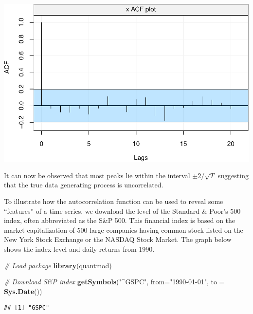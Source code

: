 \documentclass[]{book}
\newenvironment{Shaded}{\begin{snugshade}}{\end{snugshade}}
\newcommand{\CommentTok}[1]{\textcolor[rgb]{0.56,0.35,0.01}{\textit{#1}}}
\newcommand{\DataTypeTok}[1]{\textcolor[rgb]{0.13,0.29,0.53}{#1}}
\newcommand{\KeywordTok}[1]{\textcolor[rgb]{0.13,0.29,0.53}{\textbf{#1}}}
\newcommand{\NormalTok}[1]{#1}
\newcommand{\StringTok}[1]{\textcolor[rgb]{0.31,0.60,0.02}{#1}}
\theoremstyle{definition}
\theoremstyle{definition}
\theoremstyle{definition}
\theoremstyle{remark}
\let\BeginKnitrBlock\begin \let\EndKnitrBlock\end
\begin{document}
\includegraphics{ts_files/figure-latex/basicACF2-1.pdf}

It can now be observed that most peaks lie within the interval
\(\pm 2/\sqrt{T}\) suggesting that the true data generating process is
uncorrelated.

\BeginKnitrBlock{example}
\protect\hypertarget{exm:acffeatures}{}{\label{exm:acffeatures} }To
illustrate how the autocorrelation function can be used to reveal some
``features'' of a time series, we download the level of the Standard \&
Poor's 500 index, often abbreviated as the S\&P 500. This financial
index is based on the market capitalization of 500 large companies
having common stock listed on the New York Stock Exchange or the NASDAQ
Stock Market. The graph below shows the index level and daily returns
from 1990.
\EndKnitrBlock{example}

\begin{Shaded}
\begin{Highlighting}[]
\CommentTok{# Load package}
\KeywordTok{library}\NormalTok{(quantmod)}

\CommentTok{# Download S&P index}
\KeywordTok{getSymbols}\NormalTok{(}\StringTok{"^GSPC"}\NormalTok{, }\DataTypeTok{from=}\StringTok{"1990-01-01"}\NormalTok{, }\DataTypeTok{to =} \KeywordTok{Sys.Date}\NormalTok{())}
\end{Highlighting}
\end{Shaded}

\begin{verbatim}
## [1] "GSPC"
\end{verbatim}
\end{document}
